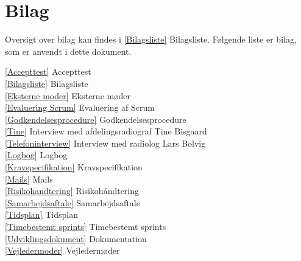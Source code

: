 \chapter{Bilag}\label{kapBilag}
Oversigt over bilag kan findes i \ref{Bilagsliste} Bilagsliste. Følgende liste er bilag, som er anvendt i dette dokument. 

\ref{Accepttest} Accepttest \\
\ref{Bilagsliste} Bilagsliste\\
\ref{Eksterne moder} Eksterne møder \\
\ref{Evaluering Scrum} Evaluering af Scrum\\
\ref{Godkendelsesprocedure} Godkendelsesprocedure\\
\ref{Tine} Interview med afdelingsradiograf Tine Bisgaard\\
\ref{Telefoninterview} Interview med radiolog Lars Bolvig \\
\ref{Logbog} Logbog\\
\ref{Kravspecifikation} Kravspecifikation\\
\ref{Mails} Mails \\
\ref{Risikohandtering} Risikohåndtering \\
\ref{Samarbejdsaftale} Samarbejdsaftale \\
\ref{Tidsplan} Tidsplan \\
\ref{Timebestemt sprints} Timebestemt sprints\\
\ref{Udviklingsdokument} Dokumentation\\
\ref{Vejledermoder} Vejledermøder



